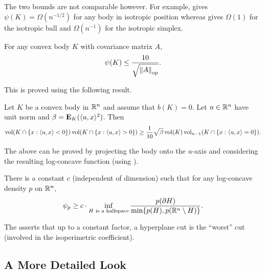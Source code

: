 		The two bounds  are not comparable however. For example,  gives $\psi(K)=\Omega(n^{-1/2})$ for any body in isotropic position whereas  gives $\Omega(1)$ for the isotropic ball and $\Omega(n^{-1})$ for the isotropic simplex.\\


		\begin{theorem}
			\label{kls conj hyperplane}
			For any convex body $K$ with covariance matrix $A$,
			\[ \psi(K) \leq \frac{10}{\sqrt{\left\lVert A\right\rVert_{\text{op}}}}. \]
		\end{theorem}

		This is proved using the following result.

		\begin{theorem}
			Let $K$ be a convex body in $\mathbb{R}^n$ and assume that $b(K)=0$. Let $u\in\mathbb{R}^n$ have unit norm and $\beta=\textbf{E}_K(\langle u,x\rangle^2)$. Then
			\[ \operatorname{vol}(K \cap \{x : \langle u,x\rangle < 0\}) \operatorname{vol}(K \cap \{x : \langle u,x\rangle > 0\}) \geq \frac{1}{10}\sqrt{\beta}\operatorname{vol}(K)\operatorname{vol}_{n-1}(K \cap \{x : \langle u,x\rangle = 0\}). \]
		\end{theorem}

		The above can be proved by projecting the body onto the $u$-axis and considering the resulting log-concave function (using ).

		\begin{fcon}
			\label{con: kls conjecture}
			There is a constant $c$ (independent of dimension) such that for any log-concave density $p$ on $\mathbb{R}^n$,
			\[ \psi_p \geq c \cdot \inf_{H\text{ is a halfspace}} \frac{p(\partial H)}{\min\{p(H),p(\mathbb{R}^n\setminus H)\}}. \]
		\end{fcon}

		The  asserts that up to a constant factor, a hyperplane cut is the ``worst'' cut (involved in the isoperimetric coefficient).


\subsection{A More Detailed Look}

